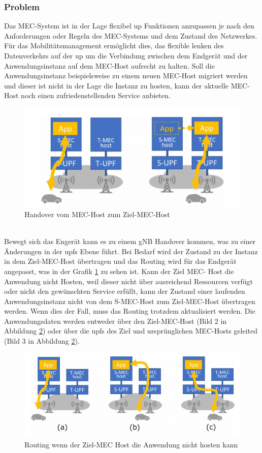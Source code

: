 \documentclass[runningheads]{llncs}
\numberwithin{figure}{section}
\begin{document}
\subsubsection{Problem}
Das MEC-System ist in der Lage flexibel \acrlong{up} Funktionen anzupassen je nach den Anforderungen oder Regeln des MEC-Systems 
und dem Zustand des Netzwerkes. Für das Mobilitätsmanagement ermöglicht dies, das flexible lenken des Datenverkehrs auf der \acrshort{up}
um die Verbindung zwischen dem Endgerät und der Anwendungsinstanz auf dem MEC-Host aufrecht zu halten. Soll die Anwendungsinstanz
beispielsweise zu einem neuen MEC-Host migriert werden und dieser ist nicht in der Lage die Instanz zu hosten, kann der aktuelle
MEC-Host noch einen zufriedenstellenden Service anbieten.
\begin{figure}
  \includegraphics[width=\linewidth]{images/Verschieben_Instanz.png}
  \caption{Handover vom MEC-Host zum Ziel-MEC-Host}
  \label{fig:Verschieben_Instanz}
\end{figure}
\\
Bewegt sich das Engerät kann es zu einem gNB Handover kommen, was zu einer Änderungen in der \acrshort{upf}s Ebene führt. 
Bei Bedarf wird der Zustand zu der Instanz in dem Ziel-MEC-Host übertragen und das Routing wird für das Endgerät angepasst, 
was in der Grafik \ref{fig:Verschieben_Instanz} zu sehen ist.
Kann der Ziel MEC- Host die Anwendung nicht Hosten, weil dieser nicht über ausreichend Ressourcen verfügt oder nicht den gewünschten Service
erfüllt, kann der Zustand einer laufenden Anwendungsinstanz nicht von dem S-MEC-Host zum Ziel-MEC-Host übertragen werden. 
Wenn dies der Fall, muss das Routing
trotzdem aktualisiert werden. Die Anwendungsdaten werden entweder über den Ziel-MEC-Host (Bild 2 in Abbildung \ref{fig:mecerror}) 
oder über die \acrshort{upf}s des Ziel und ursprünglichen MEC-Hosts geleited (Bild 3 in Abbildung \ref{fig:mecerror}).
\begin{figure}
  \includegraphics[width=\linewidth]{images/MEC_host_Error.png}
  \caption{Routing wenn der Ziel-MEC Host die Anwendung nicht hosten kann}
  \label{fig:mecerror}
\end{figure}
\end{document}
